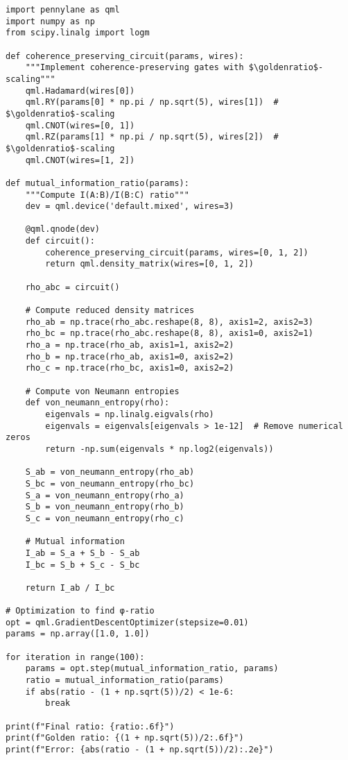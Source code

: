 \documentclass[11pt]{article}
\theoremstyle{definition}
\newcommand{\goldenratio}{\phi}
\begin{document}
\begin{verbatim}
import pennylane as qml
import numpy as np
from scipy.linalg import logm

def coherence_preserving_circuit(params, wires):
    """Implement coherence-preserving gates with $\goldenratio$-scaling"""
    qml.Hadamard(wires[0])
    qml.RY(params[0] * np.pi / np.sqrt(5), wires[1])  # $\goldenratio$-scaling
    qml.CNOT(wires=[0, 1])
    qml.RZ(params[1] * np.pi / np.sqrt(5), wires[2])  # $\goldenratio$-scaling
    qml.CNOT(wires=[1, 2])

def mutual_information_ratio(params):
    """Compute I(A:B)/I(B:C) ratio"""
    dev = qml.device('default.mixed', wires=3)
    
    @qml.qnode(dev)
    def circuit():
        coherence_preserving_circuit(params, wires=[0, 1, 2])
        return qml.density_matrix(wires=[0, 1, 2])
    
    rho_abc = circuit()
    
    # Compute reduced density matrices
    rho_ab = np.trace(rho_abc.reshape(8, 8), axis1=2, axis2=3)
    rho_bc = np.trace(rho_abc.reshape(8, 8), axis1=0, axis2=1)
    rho_a = np.trace(rho_ab, axis1=1, axis2=2)
    rho_b = np.trace(rho_ab, axis1=0, axis2=2)
    rho_c = np.trace(rho_bc, axis1=0, axis2=2)
    
    # Compute von Neumann entropies
    def von_neumann_entropy(rho):
        eigenvals = np.linalg.eigvals(rho)
        eigenvals = eigenvals[eigenvals > 1e-12]  # Remove numerical zeros
        return -np.sum(eigenvals * np.log2(eigenvals))
    
    S_ab = von_neumann_entropy(rho_ab)
    S_bc = von_neumann_entropy(rho_bc)
    S_a = von_neumann_entropy(rho_a)
    S_b = von_neumann_entropy(rho_b)
    S_c = von_neumann_entropy(rho_c)
    
    # Mutual information
    I_ab = S_a + S_b - S_ab
    I_bc = S_b + S_c - S_bc
    
    return I_ab / I_bc

# Optimization to find φ-ratio
opt = qml.GradientDescentOptimizer(stepsize=0.01)
params = np.array([1.0, 1.0])

for iteration in range(100):
    params = opt.step(mutual_information_ratio, params)
    ratio = mutual_information_ratio(params)
    if abs(ratio - (1 + np.sqrt(5))/2) < 1e-6:
        break

print(f"Final ratio: {ratio:.6f}")
print(f"Golden ratio: {(1 + np.sqrt(5))/2:.6f}")
print(f"Error: {abs(ratio - (1 + np.sqrt(5))/2):.2e}")
\end{verbatim}
\end{document}
